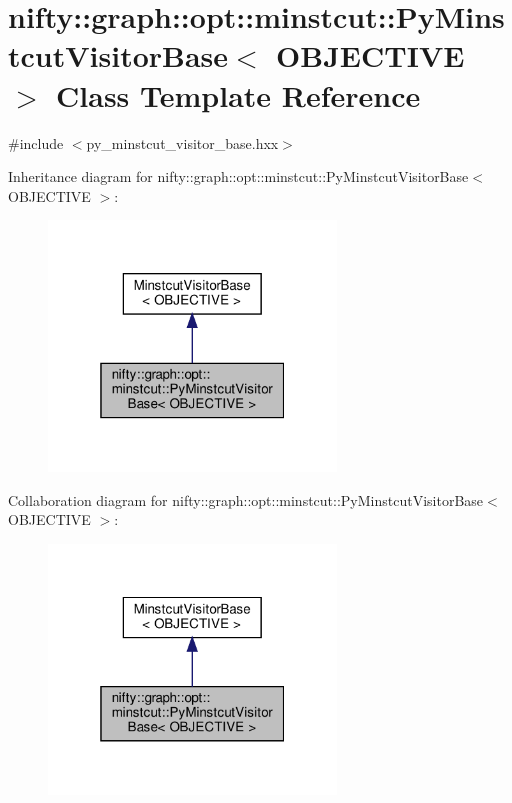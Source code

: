 \hypertarget{classnifty_1_1graph_1_1opt_1_1minstcut_1_1PyMinstcutVisitorBase}{}\section{nifty\+:\+:graph\+:\+:opt\+:\+:minstcut\+:\+:Py\+Minstcut\+Visitor\+Base$<$ O\+B\+J\+E\+C\+T\+I\+VE $>$ Class Template Reference}
\label{classnifty_1_1graph_1_1opt_1_1minstcut_1_1PyMinstcutVisitorBase}


{\ttfamily \#include $<$py\+\_\+minstcut\+\_\+visitor\+\_\+base.\+hxx$>$}



Inheritance diagram for nifty\+:\+:graph\+:\+:opt\+:\+:minstcut\+:\+:Py\+Minstcut\+Visitor\+Base$<$ O\+B\+J\+E\+C\+T\+I\+VE $>$\+:
\nopagebreak
\begin{figure}[H]
\begin{center}
\leavevmode
\includegraphics[width=217pt]{classnifty_1_1graph_1_1opt_1_1minstcut_1_1PyMinstcutVisitorBase__inherit__graph}
\end{center}
\end{figure}


Collaboration diagram for nifty\+:\+:graph\+:\+:opt\+:\+:minstcut\+:\+:Py\+Minstcut\+Visitor\+Base$<$ O\+B\+J\+E\+C\+T\+I\+VE $>$\+:
\nopagebreak
\begin{figure}[H]
\begin{center}
\leavevmode
\includegraphics[width=217pt]{classnifty_1_1graph_1_1opt_1_1minstcut_1_1PyMinstcutVisitorBase__coll__graph}
\end{center}
\end{figure}
